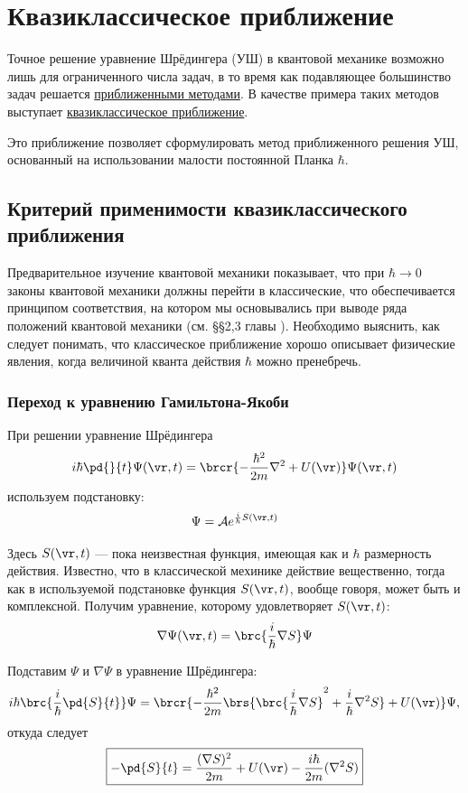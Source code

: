 \chapter{Квазиклассическое приближение}

Точное решение уравнение Шрёдингера (УШ) в квантовой механике возможно лишь для ограниченного числа задач, в то время как подавляющее большинство задач решается \underline{приближенными методами}. В качестве примера таких методов выступает \underline{квазиклассическое приближение}.

Это приближение позволяет сформулировать метод приближенного решения УШ, основанный на использовании малости постоянной Планка $\hbar$.
 
\section{Критерий применимости квазиклассического приближения}

Предварительное изучение квантовой механики показывает, что при $\hbar \to 0$ законы квантовой механики должны перейти в классические, что обеспечивается принципом соответствия, на котором мы основывались при выводе ряда положений квантовой механики (см. \S\S 2,3 главы ). Необходимо выяснить, как следует понимать, что классическое приближение хорошо описывает физические явления, когда величиной кванта действия $\hbar$ можно пренебречь.

\subsection{Переход к уравнению Гамильтона-Якоби}

При решении уравнение Шрёдингера
$$
i\hbar \pd{}{t} \Psi(\vr, t) = \brcr{-\frac{\hbar^2}{2m} \nabla^2 + U(\vr)} \Psi(\vr,t)
$$
используем подстановку:
$$
\Psi = \mathcal{A} e^{\frac{i}{\hbar}S(\vr,t)}
$$

Здесь $S(\vr, t)$ --- пока неизвестная функция, имеющая как и $\hbar$ размерность действия. Известно, что в классической мехинике действие вещественно, тогда как в используемой подстановке функция $S(\vr, t)$, вообще говоря, может быть и комплексной. Получим уравнение, которому удовлетворяет $S(\vr, t)$:   
$$
\nabla \Psi(\vr,t) = \brc{\frac{i}{\hbar}\nabla S}\Psi
$$

Подставим $\Psi$ и $\nabla \Psi$ в уравнение Шрёдингера:
$$
i\hbar\brc{\frac{i}{\hbar}\pd{S}{t}}\Psi = 
\brcr{ -\frac{\hbar^2}{2m} \brs{ \brc{\frac{i}{\hbar}\nabla S}^2 + \frac{i}{\hbar}{\nabla^2} S} + U(\vr) } \Psi,
$$
откуда следует
\begin{equation}
\label{eq:11_1_1}
\boxed{-\pd{S}{t} = \frac{(\nabla S)^2}{2m} + U(\vr) - \frac{i\hbar}{2m} (\nabla^2 S)}
\end{equation}

